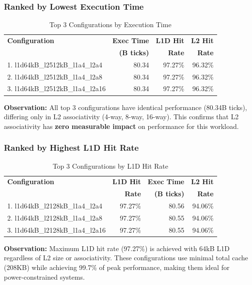 \documentclass[11pt,a4paper]{article}
\begin{document}
\subsubsection{Ranked by Lowest Execution Time}

\begin{table}[H]
\centering
\caption{Top 3 Configurations by Execution Time}
\begin{tabular}{lrrr}
\toprule
\textbf{Configuration} & \textbf{Exec Time} & \textbf{L1D Hit} & \textbf{L2 Hit} \\
 & \textbf{(B ticks)} & \textbf{Rate} & \textbf{Rate} \\
\midrule
1. l1d64kB\_l2512kB\_l1a4\_l2a4  & 80.34 & 97.27\% & 96.32\% \\
2. l1d64kB\_l2512kB\_l1a4\_l2a8  & 80.34 & 97.27\% & 96.32\% \\
3. l1d64kB\_l2512kB\_l1a4\_l2a16 & 80.34 & 97.27\% & 96.32\% \\
\bottomrule
\end{tabular}
\end{table}

\textbf{Observation:} All top 3 configurations have identical performance (80.34B ticks), differing only in L2 associativity (4-way, 8-way, 16-way). This confirms that L2 associativity has \textbf{zero measurable impact} on performance for this workload.

\subsubsection{Ranked by Highest L1D Hit Rate}

\begin{table}[H]
\centering
\caption{Top 3 Configurations by L1D Hit Rate}
\begin{tabular}{lrrr}
\toprule
\textbf{Configuration} & \textbf{L1D Hit} & \textbf{Exec Time} & \textbf{L2 Hit} \\
 & \textbf{Rate} & \textbf{(B ticks)} & \textbf{Rate} \\
\midrule
1. l1d64kB\_l2128kB\_l1a4\_l2a4  & 97.27\% & 80.56 & 94.06\% \\
2. l1d64kB\_l2128kB\_l1a4\_l2a8  & 97.27\% & 80.55 & 94.06\% \\
3. l1d64kB\_l2128kB\_l1a4\_l2a16 & 97.27\% & 80.55 & 94.06\% \\
\bottomrule
\end{tabular}
\end{table}

\textbf{Observation:} Maximum L1D hit rate (97.27\%) is achieved with 64kB L1D regardless of L2 size or associativity. These configurations use minimal total cache (208KB) while achieving 99.7\% of peak performance, making them ideal for power-constrained systems.
\end{document}
